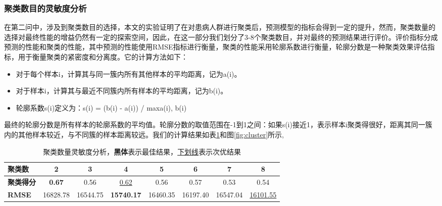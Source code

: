 \documentclass[bwprint]{gmcmthesis}
\begin{document}
\subsubsection{聚类数目的灵敏度分析}
在第二问中，涉及到聚类数目的选择，本文的实验证明了在对患病人群进行聚类后，预测模型的指标会得到一定的提升，然而，聚类数量的选择对最终性能的增益仍然有一定的探索空间\cite{hamerly2003learning}，因此，在这一部分我们划分了3-8个聚类数目，并对最终的预测结果进行评价。评价指标分成预测的性能和聚类的性能，其中预测的性能使用RMSE指标进行衡量，聚类的性能采用轮廓系数进行衡量，轮廓分数是一种聚类效果评估指标，用于衡量聚类的紧密度和分离度。它的计算方法如下：
\begin{itemize}
    \item 对于每个样本i，计算其与同一簇内所有其他样本的平均距离，记为a(i)。
    \item 对于样本i，计算其与最近不同簇内所有样本的平均距离，记为b(i)。
    \item 轮廓系数s(i)定义为：s(i) = (b(i) - a(i)) / max{a(i), b(i)}
\end{itemize}
最终的轮廓分数是所有样本的轮廓系数的平均值。轮廓分数的取值范围在-1到1之间：如果s(i)接近1，表示样本i聚类得很好，距离其同一簇内的其他样本较近，与不同簇的样本距离较远。我们的计算结果如表\ref{tab:cluster}和图\ref{fig:cluster}所示,
\begin{table}[ht]
\centering
\caption{聚类数量灵敏度分析，\textbf{黑体}表示最佳结果，\underline{下划线}表示次优结果}
\label{tab:cluster}
\fontsize{11}{9}\selectfont
    \renewcommand\tabcolsep{6pt}
    {
\begin{tabular}{lccccccc}
\toprule[1.2pt]
\textbf{聚类数}  & 2             & 3        & 4                 & 5        & 6        & 7        & 8        \\ \midrule
\textbf{聚类得分} & \textbf{0.67} & 0.56     & \underline{0.62}              & 0.56     & 0.57     & 0.53     & 0.54     \\
\textbf{RMSE} & 16828.78      & 16544.75 & \textbf{15740.17} & 16460.35 & 16197.40 & 16547.04 & \underline{16101.55} \\ \bottomrule[1.2pt]
\end{tabular}}
\end{table}
\end{document}
